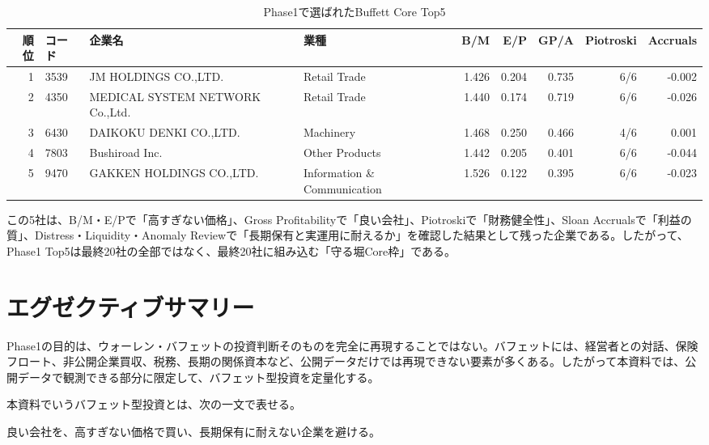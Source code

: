 \documentclass[11pt,a4paper]{article}
\begin{document}
\begin{table}[H]
\caption{Phase1で選ばれたBuffett Core Top5}
\label{tab:top5-result-first}
\centering
\scriptsize
\begin{tabularx}{\linewidth}{r p{12mm} p{36mm} p{28mm} r r r r r}
\toprule
順位 & コード & 企業名 & 業種 & B/M & E/P & GP/A & Piotroski & Accruals \\
\midrule
1 & 3539 & JM HOLDINGS CO.,LTD. & Retail Trade & 1.426 & 0.204 & 0.735 & 6/6 & -0.002 \\
2 & 4350 & MEDICAL SYSTEM NETWORK Co.,Ltd. & Retail Trade & 1.440 & 0.174 & 0.719 & 6/6 & -0.026 \\
3 & 6430 & DAIKOKU DENKI CO.,LTD. & Machinery & 1.468 & 0.250 & 0.466 & 4/6 & 0.001 \\
4 & 7803 & Bushiroad Inc. & Other Products & 1.442 & 0.205 & 0.401 & 6/6 & -0.044 \\
5 & 9470 & GAKKEN HOLDINGS CO.,LTD. & Information \& Communication & 1.526 & 0.122 & 0.395 & 6/6 & -0.023 \\
\bottomrule
\end{tabularx}
\end{table}

\begin{defbox}
この5社は、B/M・E/Pで「高すぎない価格」、Gross Profitabilityで「良い会社」、Piotroskiで「財務健全性」、Sloan Accrualsで「利益の質」、Distress・Liquidity・Anomaly Reviewで「長期保有と実運用に耐えるか」を確認した結果として残った企業である。したがって、Phase1 Top5は最終20社の全部ではなく、最終20社に組み込む「守る堀Core枠」である。
\end{defbox}

\clearpage
\tableofcontents
\newpage

\section{エグゼクティブサマリー}

Phase1の目的は、ウォーレン・バフェットの投資判断そのものを完全に再現することではない。バフェットには、経営者との対話、保険フロート、非公開企業買収、税務、長期の関係資本など、公開データだけでは再現できない要素が多くある。したがって本資料では、公開データで観測できる部分に限定して、バフェット型投資を定量化する。

本資料でいうバフェット型投資とは、次の一文で表せる。

\begin{keybox}
\centering
\Large 良い会社を、高すぎない価格で買い、長期保有に耐えない企業を避ける。
\end{keybox}
\end{document}
